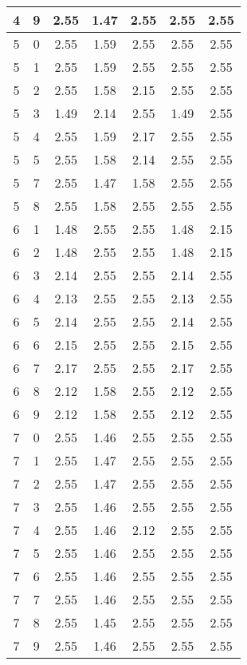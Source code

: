 \begin{longtable}{|c|c||c||c|c||c|c|}
	4 & 9 & 2.55 & 1.47 & 2.55 & 2.55 & 2.55 \\ \hline
	5 & 0 & 2.55 & 1.59 & 2.55 & 2.55 & 2.55 \\ \hline
	5 & 1 & 2.55 & 1.59 & 2.55 & 2.55 & 2.55 \\ \hline
	5 & 2 & 2.55 & 1.58 & 2.15 & 2.55 & 2.55 \\ \hline
	5 & 3 & 1.49 & 2.14 & 2.55 & 1.49 & 2.55 \\ \hline
	5 & 4 & 2.55 & 1.59 & 2.17 & 2.55 & 2.55 \\ \hline
	5 & 5 & 2.55 & 1.58 & 2.14 & 2.55 & 2.55 \\ \hline
	5 & 7 & 2.55 & 1.47 & 1.58 & 2.55 & 2.55 \\ \hline
	5 & 8 & 2.55 & 1.58 & 2.55 & 2.55 & 2.55 \\ \hline
	6 & 1 & 1.48 & 2.55 & 2.55 & 1.48 & 2.15 \\ \hline
	6 & 2 & 1.48 & 2.55 & 2.55 & 1.48 & 2.15 \\ \hline
	6 & 3 & 2.14 & 2.55 & 2.55 & 2.14 & 2.55 \\ \hline
	6 & 4 & 2.13 & 2.55 & 2.55 & 2.13 & 2.55 \\ \hline
	6 & 5 & 2.14 & 2.55 & 2.55 & 2.14 & 2.55 \\ \hline
	6 & 6 & 2.15 & 2.55 & 2.55 & 2.15 & 2.55 \\ \hline
	6 & 7 & 2.17 & 2.55 & 2.55 & 2.17 & 2.55 \\ \hline
	6 & 8 & 2.12 & 1.58 & 2.55 & 2.12 & 2.55 \\ \hline
	6 & 9 & 2.12 & 1.58 & 2.55 & 2.12 & 2.55 \\ \hline
	7 & 0 & 2.55 & 1.46 & 2.55 & 2.55 & 2.55 \\ \hline
	7 & 1 & 2.55 & 1.47 & 2.55 & 2.55 & 2.55 \\ \hline
	7 & 2 & 2.55 & 1.47 & 2.55 & 2.55 & 2.55 \\ \hline
	7 & 3 & 2.55 & 1.46 & 2.55 & 2.55 & 2.55 \\ \hline
	7 & 4 & 2.55 & 1.46 & 2.12 & 2.55 & 2.55 \\ \hline
	7 & 5 & 2.55 & 1.46 & 2.55 & 2.55 & 2.55 \\ \hline
	7 & 6 & 2.55 & 1.46 & 2.55 & 2.55 & 2.55 \\ \hline
	7 & 7 & 2.55 & 1.46 & 2.55 & 2.55 & 2.55 \\ \hline
	7 & 8 & 2.55 & 1.45 & 2.55 & 2.55 & 2.55 \\ \hline
	7 & 9 & 2.55 & 1.46 & 2.55 & 2.55 & 2.55 \\ \hline
\end{longtable}
